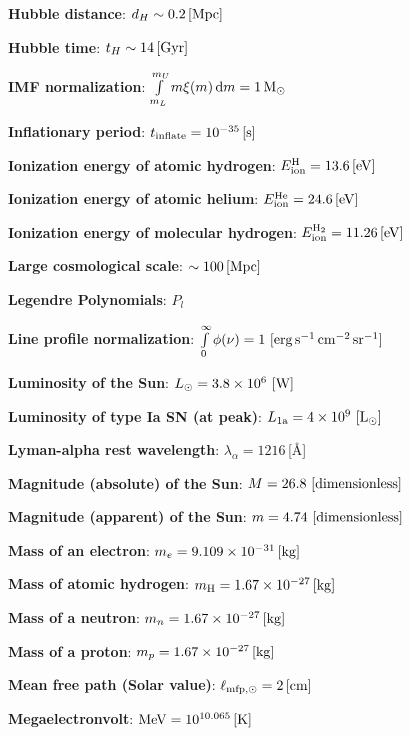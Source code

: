 \documentclass[a4paper,10pt]{article}
\begin{document}
{\noindent}\textbf{Hubble distance}: $d_H \sim 0.2\,[{\rm Mpc}]$

{\noindent}\textbf{Hubble time}: $t_H \sim 14\,[{\rm Gyr}]$

{\noindent}\textbf{IMF normalization}: $\int\limits_{m_L}^{m_U} m\xi(m)\,\mathrm{d}m = 1\,{\rm M}_\odot$

{\noindent}\textbf{Inflationary period}: $t_\mathrm{inflate} = 10^{-35}\,[{\rm s}]$

{\noindent}\textbf{Ionization energy of atomic hydrogen}: $E_\mathrm{ion}^\mathrm{H} = 13.6\,[{\rm eV}]$

{\noindent}\textbf{Ionization energy of atomic helium}: $E_\mathrm{ion}^\mathrm{He} = 24.6\,[{\rm eV}]$

{\noindent}\textbf{Ionization energy of molecular hydrogen}: $E_\mathrm{ion}^\mathrm{H_2} = 11.26\,[{\rm eV}]$

{\noindent}\textbf{Large cosmological scale}: $\sim 100\,[{\rm Mpc}]$

{\noindent}\textbf{Legendre Polynomials}: $P_l$

{\noindent}\textbf{Line profile normalization}: $\int\limits_0^\infty \phi(\nu)=1 ~ [{\rm erg\,s^{-1}\,cm^{-2}\,sr^{-1}}]$

{\noindent}\textbf{Luminosity of the Sun}: $L_\odot=3.8\times10^6 ~ [{\rm W}]$

{\noindent}\textbf{Luminosity of type Ia SN (at peak)}: $L_\mathrm{1a}=4\times10^9 ~ [{\rm L_\odot}]$

{\noindent}\textbf{Lyman-alpha rest wavelength}: $\lambda_\alpha = 1216$\,[\AA]

{\noindent}\textbf{Magnitude (absolute) of the Sun}: $M = 26.8 ~ [{\rm dimensionless}]$

{\noindent}\textbf{Magnitude (apparent) of the Sun}: $m = 4.74 ~ [{\rm dimensionless}]$

{\noindent}\textbf{Mass of an electron}: $m_e = 9.109\times10^{-31}\,[{\rm kg}]$

{\noindent}\textbf{Mass of atomic hydrogen}: $m_{\rm H} = 1.67\times10^{-27}\,[{\rm kg}]$

{\noindent}\textbf{Mass of a neutron}: $m_n = 1.67\times10^{-27}\,[{\rm kg}]$

{\noindent}\textbf{Mass of a proton}: $m_p = 1.67\times10^{-27}\,[{\rm kg}]$

{\noindent}\textbf{Mean free path (Solar value)}: $\ell_{{\rm mfp},\odot} = 2\,[{\rm cm}]$

{\noindent}\textbf{Megaelectronvolt}: ${\rm MeV} = 10^{10.065}\,[{\rm K}]$
\end{document}
